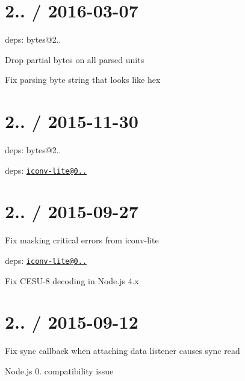 \section*{2.. / 2016-\/03-\/07 }


\begin{DoxyItemize}
\item deps\+: bytes@2..
\begin{DoxyItemize}
\item Drop partial bytes on all parsed units
\item Fix parsing byte string that looks like hex
\end{DoxyItemize}
\end{DoxyItemize}

\section*{2.. / 2015-\/11-\/30 }


\begin{DoxyItemize}
\item deps\+: bytes@2..
\item deps\+: \href{mailto:iconv-lite@0.4.13}{\tt iconv-\/lite@0..}
\end{DoxyItemize}

\section*{2.. / 2015-\/09-\/27 }


\begin{DoxyItemize}
\item Fix masking critical errors from {\ttfamily iconv-\/lite}
\item deps\+: \href{mailto:iconv-lite@0.4.12}{\tt iconv-\/lite@0..}
\begin{DoxyItemize}
\item Fix C\+E\+S\+U-\/8 decoding in Node.\+js 4.\+x
\end{DoxyItemize}
\end{DoxyItemize}

\section*{2.. / 2015-\/09-\/12 }


\begin{DoxyItemize}
\item Fix sync callback when attaching data listener causes sync read
\begin{DoxyItemize}
\item Node.\+js 0. compatibility issue
\end{DoxyItemize}
\end{DoxyItemize}

